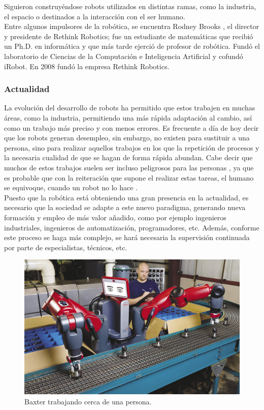 \noindent Siguieron construyéndose robots utilizados en distintas ramas, como la industria, el espacio o destinados a la interacción con el ser humano. \\
\noindent Entre algunos impulsores de la robótica, se encuentra Rodney Brooks \cite{rodneybrooks}, el director y presidente de Rethink Robotics; fue un estudiante de matemáticas que recibió un Ph.D. en informática y que más tarde ejerció de profesor de robótica. Fundó el laboratorio de Ciencias de la Computación e Inteligencia Artificial y cofundó iRobot. En 2008 fundó la empresa Rethink Robotics.

\subsubsection{Actualidad}
\label{actualidad}
\noindent La evolución del desarrollo de robots ha permitido que estos trabajen en muchas áreas, como la industria, permitiendo una más rápida adaptación al cambio, así como un trabajo más preciso y con menos errores. Es frecuente a día de hoy decir que los robots generan desempleo, sin embargo, no existen para sustituir a una persona, sino para realizar aquellos trabajos en los que la repetición de procesos y la necesaria cualidad de que se hagan de forma rápida abundan. Cabe decir que muchos de estos trabajos suelen ser incluso peligrosos para las personas \cite{tadele2014safety}, ya que es probable que con la reiteración que supone el realizar estas tareas, el humano se equivoque, cuando un robot no lo hace \cite{brown1994human}. \\
\noindent Puesto que la robótica está obteniendo una gran presencia en la actualidad, es necesario que la sociedad se adapte a este nuevo paradigma, generando nueva formación y empleo de más valor añadido, como por ejemplo ingenieros industriales, ingenieros de automatización, programadores, etc. Además, conforme este proceso se haga más complejo, se hará necesaria la supervisión continuada por parte de especialistas, técnicos, etc. \\

\begin{figure}[H]
	\centering %
	\includegraphics[scale=0.4]{imagenes/bpersona.jpeg}
	\caption{Baxter trabajando cerca de una persona.}
\end{figure}


